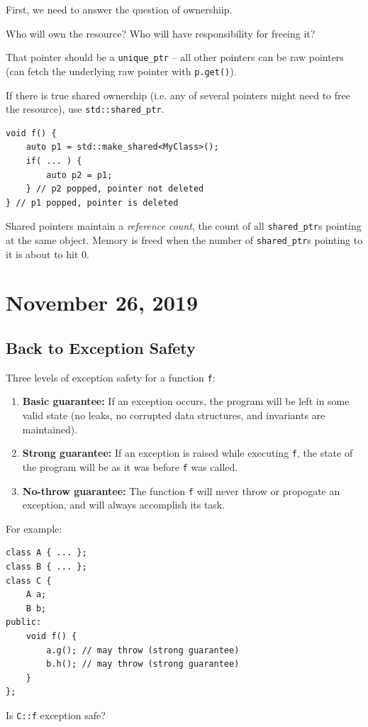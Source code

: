 \documentclass[11pt]{article}
\theoremstyle{definition}
\begin{document}
First, we need to answer the question of ownershiip.

Who will own the resource? Who will have responsibility for freeing it?

That pointer should be a {\tt unique\_ptr} -- all other pointers can be raw pointers (can fetch the underlying raw pointer with {\tt p.get()}).

If there is true shared ownership (i.e. any of several pointers might need to free the resource), use {\tt std::shared\_ptr}.
\begin{lstlisting}
void f() {
    auto p1 = std::make_shared<MyClass>();
    if( ... ) {
        auto p2 = p1;
    } // p2 popped, pointer not deleted
} // p1 popped, pointer is deleted
\end{lstlisting}
\vspace{-1.5ex}
Shared pointers maintain a \emph{reference count}, the count of all {\tt shared\_ptr}s pointing at the same object. Memory is freed when the number of {\tt shared\_ptr}s pointing to it is about to hit 0.

\newpage
\section{November 26, 2019}
\subsection{Back to Exception Safety}
Three levels of exception safety for a function {\tt f}:\vspace{-1.5ex}
\begin{enumerate}
    \item {\bf Basic guarantee:} If an exception occurs, the program will be left in some valid state (no leaks, no corrupted data structures, and invariants are maintained).
    \item {\bf Strong guarantee:} If an exception is raised while executing {\tt f}, the state of the program will be as it was before {\tt f} was called.
    \item {\bf No-throw guarantee:} The function {\tt f} will never throw or propogate an exception, and will always accomplish its task.
\end{enumerate}
\vspace{-1.5ex}
For example:
\begin{lstlisting}
class A { ... };
class B { ... };
class C {
    A a;
    B b;
public:
    void f() {
        a.g(); // may throw (strong guarantee)
        b.h(); // may throw (strong guarantee)
    }
};
\end{lstlisting}
\vspace{-1.5ex}
Is {\tt C::f} exception safe?
\end{document}
